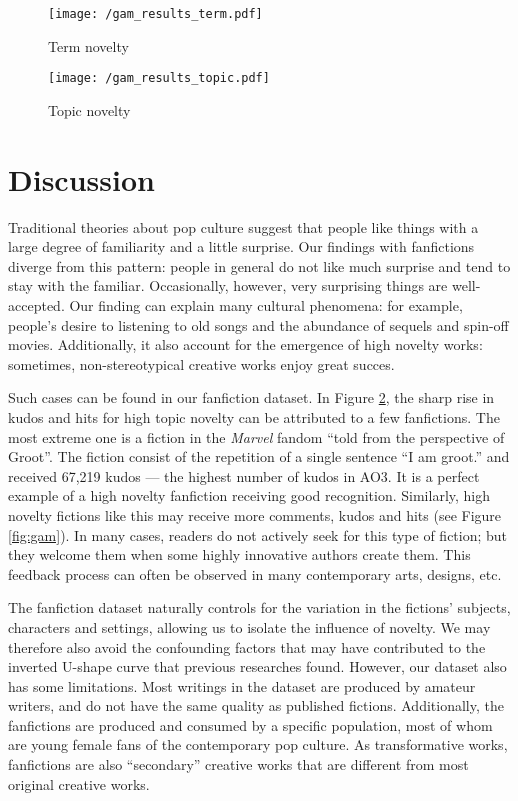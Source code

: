 \documentclass[letterpaper]{article} %
\begin{document}
\begin{figure*}
    \centering
    \begin{subfigure}{\textwidth}
          \texttt{[image: /gam\_results\_term.pdf]}
  		\caption{Term novelty} 
			\label{fig:gam_term}
       \end{subfigure}
      \begin{subfigure}{\textwidth}
          \texttt{[image: /gam\_results\_topic.pdf]}
		\caption{Topic novelty} 
		\label{fig:gam_topic}
       \end{subfigure}
           	\caption{Results of the Generalized Additive Models. 95\% confidence intervals are plotted.}
        \label{fig:gam}
\end{figure*}



\section*{Discussion}
Traditional theories about pop culture suggest that people like things with a large degree of familiarity and a little surprise. Our findings with fanfictions diverge from this pattern: people in general do not like much surprise and tend to stay with the familiar. Occasionally, however, very surprising things are well-accepted. Our finding can explain many cultural phenomena: for example, people's desire to listening to old songs and the abundance of sequels and spin-off movies. Additionally, it also account for the emergence of high novelty works: sometimes, non-stereotypical creative works enjoy great succes.

Such cases can be found in our fanfiction dataset. In Figure \ref{fig:gam_topic}, the sharp rise in kudos and hits for high topic novelty can be attributed to a few fanfictions. The most extreme one is a fiction in the \emph{Marvel} fandom ``told from the perspective of Groot''. The fiction consist of the repetition of a single sentence ``I am groot.'' and received 67,219 kudos --- the highest number of kudos in AO3. It is a perfect example of a high novelty fanfiction receiving good recognition. Similarly, high novelty fictions like this may receive more comments, kudos and hits (see Figure \ref{fig:gam}). In many cases, readers do not actively seek for this type of fiction; but they welcome them when some highly innovative authors create them. This feedback process can often be observed in many contemporary arts, designs, etc.

The fanfiction dataset naturally controls for the variation in the fictions' subjects, characters and settings, allowing us to isolate the influence of novelty. We may therefore also avoid the confounding factors that may have contributed to the inverted U-shape curve that previous researches found. However, our dataset also has some limitations. Most writings in the dataset are produced by amateur writers, and do not have the same quality as published fictions. Additionally, the fanfictions are produced and consumed by a specific population, most of whom are young female fans of the contemporary pop culture. As transformative works, fanfictions are also ``secondary'' creative works that are different from most original creative works. 
\end{document}
